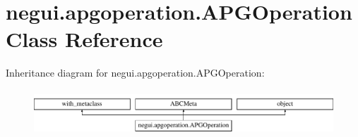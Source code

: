 \hypertarget{classnegui_1_1apgoperation_1_1APGOperation}{}\section{negui.\+apgoperation.\+A\+P\+G\+Operation Class Reference}
\label{classnegui_1_1apgoperation_1_1APGOperation}
Inheritance diagram for negui.\+apgoperation.\+A\+P\+G\+Operation\+:\begin{figure}[H]
\begin{center}
\leavevmode
\includegraphics[height=1.736434cm]{classnegui_1_1apgoperation_1_1APGOperation}
\end{center}
\end{figure}
